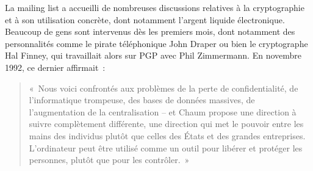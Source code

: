 La mailing list a accueilli de nombreuses discussions relatives à la cryptographie et à son utilisation concrète, dont notamment l'argent liquide électronique. Beaucoup de gens sont intervenus dès les premiers mois, dont notamment des personnalités comme le pirate téléphonique John Draper ou bien le cryptographe Hal Finney, qui travaillait alors sur PGP avec Phil Zimmermann. En novembre 1992, ce dernier affirmait~:

\begin{quote}
«~Nous voici confrontés aux problèmes de la perte de confidentialité, de l'informatique trompeuse, des bases de données massives, de l'augmentation de la centralisation -- et Chaum propose une direction à suivre complètement différente, une direction qui met le pouvoir entre les mains des individus plutôt que celles des États et des grandes entreprises. L'ordinateur peut être utilisé comme un outil pour libérer et protéger les personnes, plutôt que pour les contrôler.~»
\end{quote}


